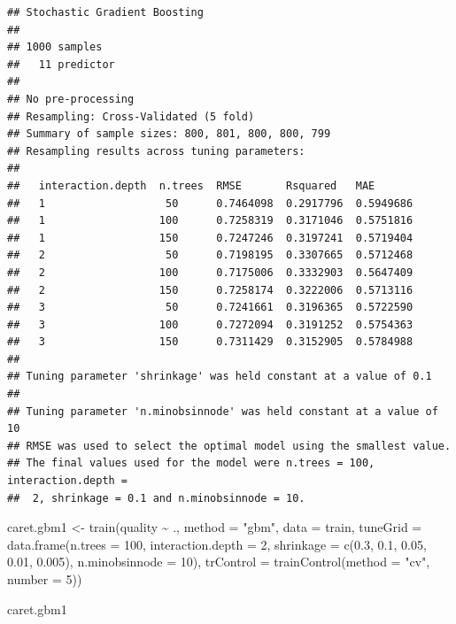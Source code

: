 \documentclass[
  spanish,
]{book}
\newenvironment{Shaded}{\begin{snugshade}}{\end{snugshade}}
\newcommand{\AttributeTok}[1]{\textcolor[rgb]{0.77,0.63,0.00}{#1}}
\newcommand{\DecValTok}[1]{\textcolor[rgb]{0.00,0.00,0.81}{#1}}
\newcommand{\FloatTok}[1]{\textcolor[rgb]{0.00,0.00,0.81}{#1}}
\newcommand{\FunctionTok}[1]{\textcolor[rgb]{0.00,0.00,0.00}{#1}}
\newcommand{\NormalTok}[1]{#1}
\newcommand{\OtherTok}[1]{\textcolor[rgb]{0.56,0.35,0.01}{#1}}
\newcommand{\SpecialCharTok}[1]{\textcolor[rgb]{0.00,0.00,0.00}{#1}}
\newcommand{\StringTok}[1]{\textcolor[rgb]{0.31,0.60,0.02}{#1}}
\theoremstyle{break}
\theoremstyle{definition}
\theoremstyle{definition}
\theoremstyle{definition}
\theoremstyle{definition}
\theoremstyle{remark}
\begin{document}
\begin{verbatim}
## Stochastic Gradient Boosting 
## 
## 1000 samples
##   11 predictor
## 
## No pre-processing
## Resampling: Cross-Validated (5 fold) 
## Summary of sample sizes: 800, 801, 800, 800, 799 
## Resampling results across tuning parameters:
## 
##   interaction.depth  n.trees  RMSE       Rsquared   MAE      
##   1                   50      0.7464098  0.2917796  0.5949686
##   1                  100      0.7258319  0.3171046  0.5751816
##   1                  150      0.7247246  0.3197241  0.5719404
##   2                   50      0.7198195  0.3307665  0.5712468
##   2                  100      0.7175006  0.3332903  0.5647409
##   2                  150      0.7258174  0.3222006  0.5713116
##   3                   50      0.7241661  0.3196365  0.5722590
##   3                  100      0.7272094  0.3191252  0.5754363
##   3                  150      0.7311429  0.3152905  0.5784988
## 
## Tuning parameter 'shrinkage' was held constant at a value of 0.1
## 
## Tuning parameter 'n.minobsinnode' was held constant at a value of 10
## RMSE was used to select the optimal model using the smallest value.
## The final values used for the model were n.trees = 100, interaction.depth =
##  2, shrinkage = 0.1 and n.minobsinnode = 10.
\end{verbatim}

\begin{Shaded}
\begin{Highlighting}[]
\NormalTok{caret.gbm1 }\OtherTok{\textless{}{-}} \FunctionTok{train}\NormalTok{(quality }\SpecialCharTok{\textasciitilde{}}\NormalTok{ ., }\AttributeTok{method =} \StringTok{"gbm"}\NormalTok{, }\AttributeTok{data =}\NormalTok{ train,}
   \AttributeTok{tuneGrid =} \FunctionTok{data.frame}\NormalTok{(}\AttributeTok{n.trees =}  \DecValTok{100}\NormalTok{, }\AttributeTok{interaction.depth =} \DecValTok{2}\NormalTok{, }
                        \AttributeTok{shrinkage =} \FunctionTok{c}\NormalTok{(}\FloatTok{0.3}\NormalTok{, }\FloatTok{0.1}\NormalTok{, }\FloatTok{0.05}\NormalTok{, }\FloatTok{0.01}\NormalTok{, }\FloatTok{0.005}\NormalTok{),}
                        \AttributeTok{n.minobsinnode =} \DecValTok{10}\NormalTok{),}
   \AttributeTok{trControl =} \FunctionTok{trainControl}\NormalTok{(}\AttributeTok{method =} \StringTok{"cv"}\NormalTok{, }\AttributeTok{number =} \DecValTok{5}\NormalTok{))}
\end{Highlighting}
\end{Shaded}

\begin{Shaded}
\begin{Highlighting}[]
\NormalTok{caret.gbm1}
\end{Highlighting}
\end{Shaded}
\end{document}
